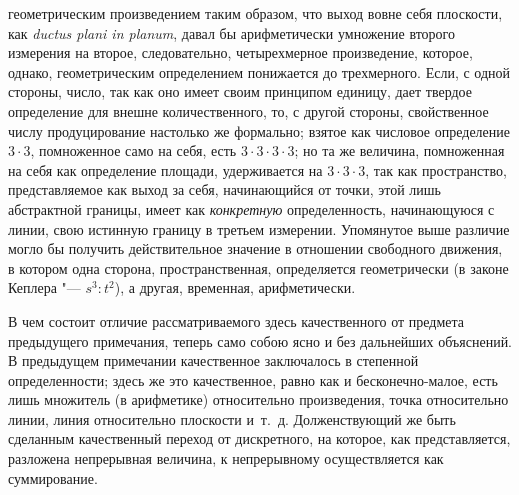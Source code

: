 геометрическим произведением таким образом, что выход вовне себя плоскости,
как {\em ductus plani in planum}, давал бы
арифметически умножение второго измерения на второе, следовательно,
четырехмерное произведение, которое, однако, геометрическим определением
понижается до трехмерного. Если, с одной стороны, число, так как оно имеет
своим принципом единицу, дает твердое определение для внешне
количественного, то, с другой стороны, свойственное числу продуцирование
настолько же формально; взятое как числовое определение $3 \cdot 3$,
помноженное само на себя, есть $3 \cdot 3 \cdot 3 \cdot 3$; но та же
величина, помноженная на себя как определение площади, удерживается
на $3 \cdot 3 \cdot 3$, так как пространство,
представляемое как выход за себя, начинающийся от точки, этой лишь
абстрактной границы, имеет как {\em конкретную}
определенность, начинающуюся с линии, свою истинную границу в третьем
измерении. Упомянутое выше различие могло бы получить действительное
значение в отношении свободного движения, в котором одна сторона,
пространственная, определяется геометрически (в законе Кеплера "---
$s^3 : t^2$), а другая, временная, арифметически.

В чем состоит отличие рассматриваемого здесь качественного от предмета
предыдущего примечания, теперь само собою ясно и без дальнейших объяснений.
В предыдущем примечании качественное заключалось в степенной
определенности; здесь же это качественное, равно как и бесконечно-малое,
есть лишь множитель (в арифметике) относительно произведения, точка
относительно линии, линия относительно плоскости и~т.~д. Долженствующий же
быть сделанным качественный переход от дискретного, на которое, как
представляется, разложена непрерывная величина, к непрерывному
осуществляется как суммирование.

